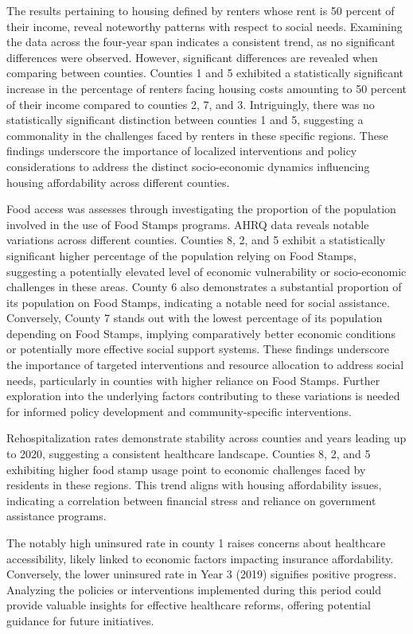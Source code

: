 \documentclass[12pt]{article}
\begin{document}
The results pertaining to housing defined by renters whose rent is 50 percent of their income, 
reveal noteworthy patterns with respect to social needs. Examining the data across the four-year span 
indicates a consistent trend, as no significant differences were observed. However, significant differences are 
revealed when comparing between counties. Counties 1 and 5 exhibited a statistically significant increase 
in the percentage of renters facing housing costs amounting to 50 percent of their income compared to 
counties 2, 7, and 3. Intriguingly, there was no statistically significant distinction between counties 
1 and 5, suggesting a commonality in the challenges faced by renters in these specific regions. These 
findings underscore the importance of localized interventions and policy considerations to address the 
distinct socio-economic dynamics influencing housing affordability across different counties.

Food access was assesses through investigating the proportion of the population involved in the use of Food Stamps programs.
AHRQ data reveals notable variations across different counties. Counties 8, 2, and 5 exhibit a statistically significant 
higher percentage of the population relying on Food Stamps, suggesting a potentially elevated level of economic 
vulnerability or socio-economic challenges in these areas. County 6 also demonstrates a substantial proportion 
of its population on Food Stamps, indicating a notable need for social assistance. Conversely, County 7 stands 
out with the lowest percentage of its population depending on Food Stamps, implying comparatively better 
economic conditions or potentially more effective social support systems. These findings underscore the 
importance of targeted interventions and resource allocation to address social needs, particularly in counties 
with higher reliance on Food Stamps. Further exploration into the underlying factors contributing to these variations 
is needed for informed policy development and community-specific interventions.

Rehospitalization rates demonstrate stability across counties and years leading up to 2020, suggesting 
a consistent healthcare landscape. Counties 8, 2, and 5 exhibiting higher food stamp usage point to economic 
challenges faced by residents in these regions. This trend aligns with housing affordability issues, 
indicating a correlation between financial stress and reliance on government assistance programs.

The notably high uninsured rate in county 1 raises concerns about healthcare accessibility, likely 
linked to economic factors impacting insurance affordability. Conversely, the lower uninsured rate in 
Year 3 (2019) signifies positive progress. Analyzing the policies or interventions implemented during 
this period could provide valuable insights for effective healthcare reforms, offering potential guidance 
for future initiatives.
\end{document}
